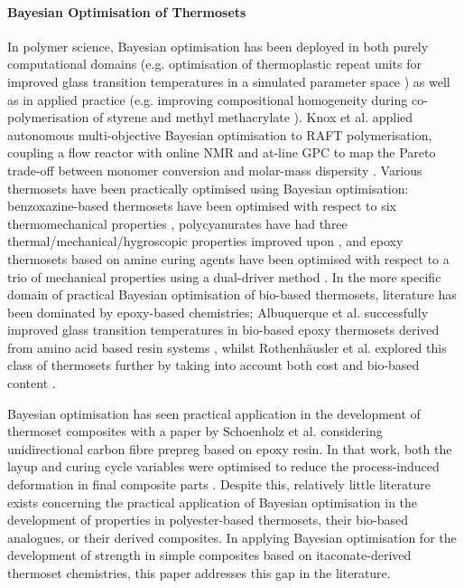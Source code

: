 \paragraph{Bayesian Optimisation of Thermosets}
In polymer science, Bayesian optimisation has been deployed in
 both purely computational domains (e.g. optimisation of thermoplastic
 repeat units for improved glass transition temperatures in a simulated
 parameter space \autocite{Minami2019}) as well as in applied practice
 (e.g. improving compositional homogeneity during co-polymerisation
 of styrene and methyl methacrylate \autocite{Takasuka2024}).
Knox et al. applied autonomous multi-objective Bayesian optimisation to RAFT
 polymerisation, coupling a flow reactor with online NMR and at-line GPC to 
 map the Pareto trade-off between monomer conversion and molar-mass 
 dispersity \autocite{Knox2022}.
Various thermosets have been practically optimised using 
 Bayesian optimisation: benzoxazine-based thermosets have been optimised
 with respect to six thermomechanical properties \autocite{Lu2025},
 polycyanurates have had three thermal/mechanical/hygroscopic properties
 improved upon \autocite{Xu2023}, and epoxy thermosets based on amine curing
 agents have been optimised with respect to a trio of mechanical
 properties using a dual-driver method \autocite{Zhao2024}.
In the more specific domain of practical Bayesian optimisation of
 bio-based thermosets, literature has been dominated by epoxy-based
 chemistries; Albuquerque et al. successfully improved glass transition
 temperatures in bio-based epoxy thermosets derived from amino acid based
 resin systems \autocite{Albuquerque2024}, whilst Rothenh\"{a}usler et al.
 explored this class of thermosets further by taking into account both cost
 and bio-based content \autocite{Rothenhausler2024}.

Bayesian optimisation has seen practical application in the development
 of thermoset composites with a paper by Schoenholz et al. considering
 unidirectional carbon fibre prepreg based on epoxy resin. In that work, 
 both the layup and curing cycle variables were optimised to reduce the 
 process-induced deformation in final composite parts \autocite{Schoenholz2024}.
Despite this, relatively little literature exists concerning the practical
 application of Bayesian optimisation in the development of properties in
 polyester-based thermosets, their bio-based analogues, or their derived
 composites.
In applying Bayesian optimisation for the development of strength in
 simple composites based on itaconate-derived thermoset chemistries, 
 this paper addresses this gap in the literature.

